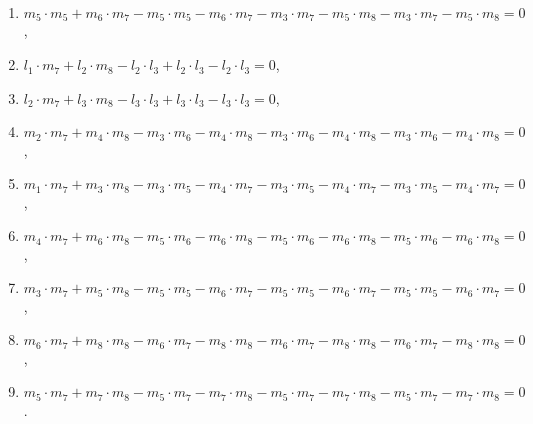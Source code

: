 \begin{enumerate}
    \item $m_5 \cdot m_5 + m_6 \cdot m_7 - m_5 \cdot m_5 - m_6 \cdot m_7 - m_3 \cdot m_7 - m_5 \cdot m_8 - m_3 \cdot m_7 - m_5 \cdot m_8 = 0$,
    \item $l_1 \cdot m_7 + l_2 \cdot m_8 - l_2 \cdot l_3 + l_2 \cdot l_3 - l_2 \cdot l_3 = 0$,
    \item $l_2 \cdot m_7 + l_3 \cdot m_8 - l_3 \cdot l_3 + l_3 \cdot l_3 - l_3 \cdot l_3 = 0$,
    \item $m_2 \cdot m_7 + m_4 \cdot m_8 - m_3 \cdot m_6 - m_4 \cdot m_8 - m_3 \cdot m_6 - m_4 \cdot m_8 - m_3 \cdot m_6 - m_4 \cdot m_8 = 0$,
    \item $m_1 \cdot m_7 + m_3 \cdot m_8 - m_3 \cdot m_5 - m_4 \cdot m_7 - m_3 \cdot m_5 - m_4 \cdot m_7 - m_3 \cdot m_5 - m_4 \cdot m_7 = 0$,
    \item $m_4 \cdot m_7 + m_6 \cdot m_8 - m_5 \cdot m_6 - m_6 \cdot m_8 - m_5 \cdot m_6 - m_6 \cdot m_8 - m_5 \cdot m_6 - m_6 \cdot m_8 = 0$,
    \item $m_3 \cdot m_7 + m_5 \cdot m_8 - m_5 \cdot m_5 - m_6 \cdot m_7 - m_5 \cdot m_5 - m_6 \cdot m_7 - m_5 \cdot m_5 - m_6 \cdot m_7 = 0$,
    \item $m_6 \cdot m_7 + m_8 \cdot m_8 - m_6 \cdot m_7 - m_8 \cdot m_8 - m_6 \cdot m_7 - m_8 \cdot m_8 - m_6 \cdot m_7 - m_8 \cdot m_8 = 0$,
    \item $m_5 \cdot m_7 + m_7 \cdot m_8 - m_5 \cdot m_7 - m_7 \cdot m_8 - m_5 \cdot m_7 - m_7 \cdot m_8 - m_5 \cdot m_7 - m_7 \cdot m_8 = 0$.
\end{enumerate}

